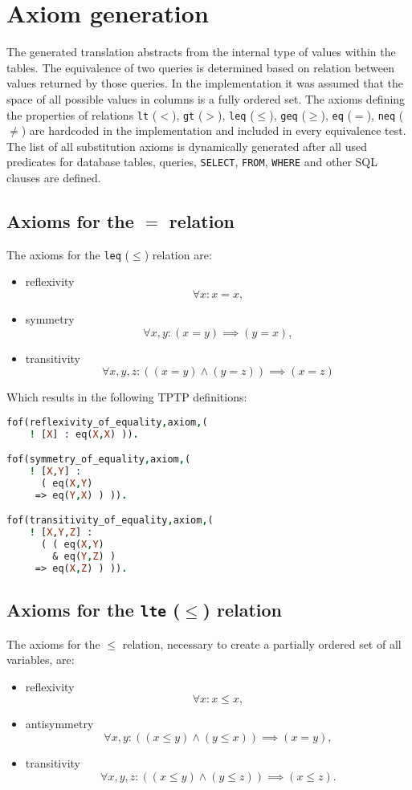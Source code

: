 \documentclass[magisterska,en]{pracamgr}
\newcommand{\code}[1]{\texttt{#1}}
\begin{document}
\section{Axiom generation} \label{sec:axioms}

The generated translation abstracts from the internal type of values within the tables. The equivalence of two queries is determined based on relation between values returned by those queries. In the implementation it was assumed that the space of all possible values in columns is a fully ordered set. The axioms defining the properties of relations \code{lt} ($<$), \code{gt} ($>$), \code{leq} ($\leq$), \code{geq} ($\geq$), \code{eq} ($=$), \code{neq} ($\neq$) are hardcoded in the implementation and included in every equivalence test. The list of all substitution axioms is dynamically generated after all used predicates for database tables, queries, \code{SELECT}, \code{FROM}, \code{WHERE} and other SQL clauses are defined.

\subsection{Axioms for the $=$ relation}
The axioms for the \code{leq} ($\leq$) relation are:
\begin{itemize}
\item reflexivity
$$
\forall x : x=x,
$$
\item symmetry
$$
\forall x, y : (x=y) \implies (y=x),
$$
\item transitivity
$$
\forall x, y, z : ((x=y) \land (y=z)) \implies (x=z)
$$
\end{itemize}
Which results in the following TPTP definitions:
\begin{lstlisting}[language=Prolog, caption=TPTP axioms for \code{eq}]
fof(reflexivity_of_equality,axiom,(
    ! [X] : eq(X,X) )). 

fof(symmetry_of_equality,axiom,(
    ! [X,Y] :
      ( eq(X,Y)
     => eq(Y,X) ) )). 

fof(transitivity_of_equality,axiom,(
    ! [X,Y,Z] :
      ( ( eq(X,Y)
        & eq(Y,Z) )
     => eq(X,Z) ) )). 
\end{lstlisting}


\subsection{Axioms for the \code{lte} ($\leq$) relation}
The axioms for the $\leq$ relation, necessary to create a partially ordered set of all variables, are:
\begin{itemize}
\item reflexivity
$$
\forall x : x \leq x,
$$
\item antisymmetry
$$
\forall x, y : ((x \leq y) \land (y \leq x)) \implies (x=y),
$$
\item transitivity
$$
\forall x, y, z : ((x \leq y) \land (y \leq z)) \implies (x \leq z).
$$
\end{itemize}
\end{document}
